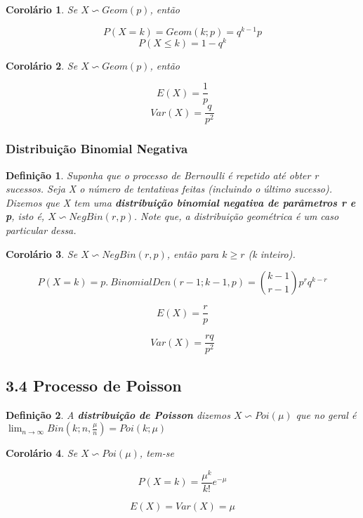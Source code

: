 \documentclass[12pt]{article}
\newtheorem{corollary}{Corolário}[theorem]
\newtheorem{definition}{Definição}
\begin{document}
\begin{corollary}
    Se $X \backsim Geom (p)$, então
    
    $$P(X = k) = Geom (k; p) = q^{k-1} p$$
    $$P(X \leq k) = 1 - q^k$$
\end{corollary}

\begin{corollary}
    Se $X \backsim Geom (p)$, então
    
    $$E(X) = \frac{1}{p}$$
    $$Var (X) = \frac{q}{p^2}$$
\end{corollary}

\subsubsection*{Distribuição Binomial Negativa}
\begin{definition}
    Suponha que o processo de Bernoulli é repetido até obter r sucessos. Seja X o número de tentativas feitas (incluindo o último sucesso). Dizemos que X tem uma \textbf{distribuição binomial negativa de parâmetros r e p}, isto é, $X \backsim NegBin(r, p)$. Note que, a distribuição geométrica é um caso particular dessa.
\end{definition}

\begin{corollary}
    Se $X \backsim NegBin(r, p)$, então para $k \geq r$ (k inteiro).
    
    $$P(X = k) = p. \ BinomialDen(r-1; k-1, p) = {k-1 \choose r-1} p^r q^{k - r}$$
    
    $$E(X) = \dfrac{r}{p}$$
    
    $$Var(X) = \dfrac{r q}{p^2}$$
\end{corollary}

\subsection*{3.4 Processo de Poisson}
\begin{definition}
    A \textbf{distribuição de Poisson} dizemos $X \backsim Poi (\mu)$ que no geral é $\lim_{n \rightarrow{} \infty} Bin (k; n, \frac{\mu}{n}) = Poi (k; \mu)$
\end{definition}

\begin{corollary}
    Se $X \backsim Poi (\mu)$, tem-se
    
    $$P(X = k) = \frac{\mu^k}{k!} e^{-\mu}$$
    
    $$E(X) = Var(X) = \mu$$
\end{corollary}
\end{document}
